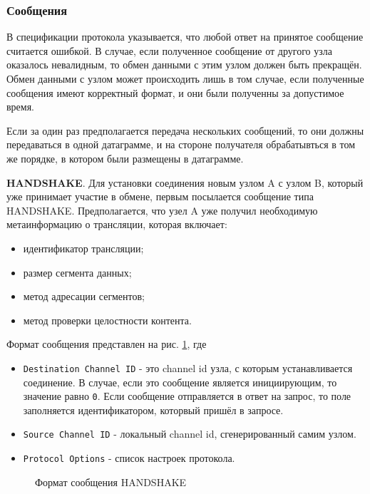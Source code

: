 		\subsubsection{Сообщения}
		В спецификации протокола указывается, что любой ответ на принятое сообщение считается ошибкой. В случае, если
		полученное сообщение от другого узла оказалось невалидным, то обмен данными с этим узлом должен быть прекращён.
		Обмен данными с узлом может происходить лишь в том случае, если полученные сообщения имеют корректный формат, и
		они были полученны за допустимое время.

		Если за один раз предполагается передача нескольких сообщений, то они должны передаваться в одной датаграмме, и
		на стороне получателя обрабатывться в том же порядке, в котором были размещены в датаграмме.

		\textbf{HANDSHAKE}. Для установки соединения новым узлом A с узлом B, который уже принимает участие в обмене,
		первым посылается сообщение типа HANDSHAKE. Предполагается, что узел A уже получил необходимую метаинформацию о
		трансляции, которая включает:
		\begin{itemize}
			\item идентификатор трансляции;
			\item размер сегмента данных;
			\item метод адресации сегментов;
			\item метод проверки целостности контента.
		\end{itemize}

		Формат сообщения представлен на рис. \ref{img:ppspp-message-handshake}, где
		\begin{itemize}
			\item \texttt{Destination Channel ID} - это channel id узла, с которым устанавливается соединение. В случае, если это
			сообщение является инициирующим, то значение равно \texttt{0}. Если сообщение отправляется в ответ на запрос,
			то поле заполняется идентификатором, которвый пришёл в запросе.
			\item \texttt{Source Channel ID} - локальный channel id, сгенерированный самим узлом.
			\item \texttt{Protocol Options} - список настроек протокола.
		\end{itemize}

		\begin{figure}[h]
			\caption{Формат сообщения HANDSHAKE}
			\label{img:ppspp-message-handshake}
		\end{figure}

